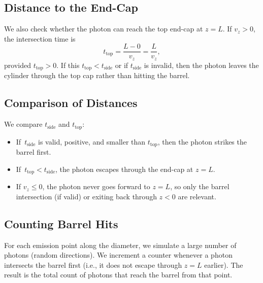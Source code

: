 \documentclass[11pt]{article}
\begin{document}
\subsection{Distance to the End-Cap}
We also check whether the photon can reach the top end-cap at \(z = L\). If \(v_z > 0\), the intersection time is
\[
t_{\mathrm{top}} = \frac{L - 0}{v_z} = \frac{L}{v_z}, 
\]
provided \(t_{\mathrm{top}}>0\). If this \(t_{\mathrm{top}} < t_{\mathrm{side}}\) or if \(t_{\mathrm{side}}\) is invalid, then the photon leaves the cylinder through the top cap rather than hitting the barrel.

\subsection{Comparison of Distances}
We compare \(t_{\mathrm{side}}\) and \(t_{\mathrm{top}}\):
\begin{itemize}
  \item If \(\,t_{\mathrm{side}}\) is valid, positive, and smaller than \(t_{\mathrm{top}}\), then the photon strikes the barrel first.
  \item If \(\,t_{\mathrm{top}} < t_{\mathrm{side}}\), the photon escapes through the end-cap at \(z = L\).
  \item If \(v_z \le 0\), the photon never goes forward to \(z = L\), so only the barrel intersection (if valid) or exiting back through \(z<0\) are relevant.
\end{itemize}

\subsection{Counting Barrel Hits}
For each emission point along the diameter, we simulate a large number of photons (random directions). We increment a counter whenever a photon intersects the barrel first (i.e., it does not escape through \(z = L\) earlier). The result is the total count of photons that reach the barrel from that point.
\end{document}
